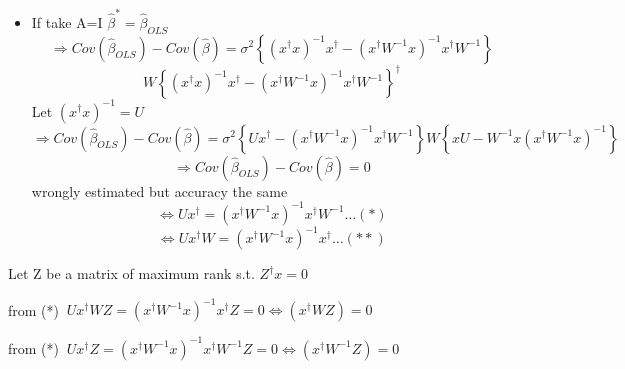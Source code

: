 \documentclass{article}
\begin{document}
\begin{itemize}
\item If take A=I $\hat{\beta}^{\ast }=\hat{\beta}_{OLS}$%
\begin{equation*}
\Rightarrow Cov\left( \hat{\beta}_{OLS}\right) -Cov\left( \hat{\beta}\right)
=\sigma ^{2}\left\{ \left( x^{\dagger }x\right) ^{-1}x^{\dagger }-\left(
x^{\dagger }W^{-1}x\right) ^{-1}x^{\dagger }W^{-1}\right\}
\end{equation*}%
\begin{equation*}
W\left\{ \left( x^{\dagger }x\right) ^{-1}x^{\dagger }-\left( x^{\dagger
}W^{-1}x\right) ^{-1}x^{\dagger }W^{-1}\right\} ^{\dagger }
\end{equation*}%
Let $\left( x^{\dagger }x\right) ^{-1}=U$%
\begin{equation*}
\Rightarrow Cov\left( \hat{\beta}_{OLS}\right) -Cov\left( \hat{\beta}\right)
=\sigma ^{2}\left\{ Ux^{\dagger }-\left( x^{\dagger }W^{-1}x\right)
^{-1}x^{\dagger }W^{-1}\right\} W\left\{ xU-W^{-1}x\left( x^{\dagger
}W^{-1}x\right) ^{-1}\right\}
\end{equation*}%
\begin{equation*}
\Rightarrow Cov\left( \hat{\beta}_{OLS}\right) -Cov\left( \hat{\beta}\right)
=0
\end{equation*}%
wrongly estimated but accuracy the same%
\begin{equation*}
\Leftrightarrow Ux^{\dagger }=\left( x^{\dagger }W^{-1}x\right)
^{-1}x^{\dagger }W^{-1}\ldots \left( \ast \right)
\end{equation*}%
\begin{equation*}
\Leftrightarrow Ux^{\dagger }W=\left( x^{\dagger }W^{-1}x\right)
^{-1}x^{\dagger }\ldots \left( \ast \ast \right)
\end{equation*}
\end{itemize}

\bigskip

Let Z be a matrix of maximum rank s.t. $Z^{\dagger }x=0$

from (*) $\ Ux^{\dagger }WZ=\left( x^{\dagger }W^{-1}x\right)
^{-1}x^{\dagger }Z=0\Leftrightarrow \left( x^{\dagger }WZ\right) =0$

from (*) $\ Ux^{\dagger }Z=\left( x^{\dagger }W^{-1}x\right) ^{-1}x^{\dagger
}W^{-1}Z=0\Leftrightarrow \left( x^{\dagger }W^{-1}Z\right) =0$
\end{document}
